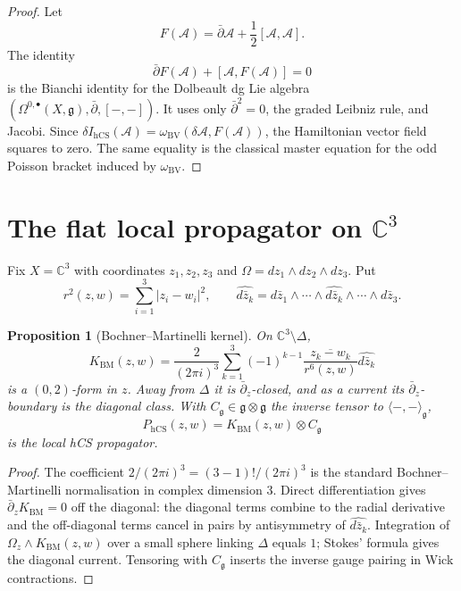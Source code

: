 \documentclass[11pt]{amsart}
\providecommand{\C}{\mathbb{C}}
\providecommand{\dbar}{\bar{\partial}}
\providecommand{\g}{\mathfrak{g}}
\providecommand{\hCS}{\mathrm{hCS}}
\providecommand{\BV}{\mathrm{BV}}
\theoremstyle{plain}
\newtheorem{proposition}[theorem]{Proposition}
\theoremstyle{definition}
\theoremstyle{remark}
\begin{document}
\begin{proof}
Let
\[
  F(\mathcal A)=\dbar\mathcal A+\frac{1}{2}[\mathcal A,\mathcal A].
\]
The identity
\[
  \dbar F(\mathcal A)+[\mathcal A,F(\mathcal A)]=0
\]
is the Bianchi identity for the Dolbeault dg Lie algebra
\((\Omega^{0,\bullet}(X,\g),\dbar,[-,-])\). It uses only
\(\dbar^2=0\), the graded Leibniz rule, and Jacobi. Since
\(\delta I_{\hCS}(\mathcal A)=\omega_{\BV}(\delta\mathcal A,F(\mathcal A))\),
the Hamiltonian vector field squares to zero. The same equality is the
classical master equation for the odd Poisson bracket induced by
\(\omega_{\BV}\).
\end{proof}

\section{The flat local propagator on \texorpdfstring{$\C^3$}{C3}}

Fix \(X=\C^3\) with coordinates \(z_1,z_2,z_3\) and
\(\Omega=dz_1\wedge dz_2\wedge dz_3\). Put
\[
  r^2(z,w)=\sum_{i=1}^{3}|z_i-w_i|^2,
  \qquad
  \widehat{d\bar z_k}
  =
  d\bar z_1\wedge\cdots\wedge\widehat{d\bar z_k}
  \wedge\cdots\wedge d\bar z_3 .
\]

\begin{proposition}[Bochner--Martinelli kernel]
On \(\C^3\setminus\Delta\),
\[
  K_{\mathrm{BM}}(z,w)
  =
  \frac{2}{(2\pi i)^3}
  \sum_{k=1}^{3}
  (-1)^{k-1}
  \frac{\overline{z_k-w_k}}{r^6(z,w)}
  \widehat{d\bar z_k}
\]
is a \((0,2)\)-form in \(z\). Away from \(\Delta\) it is
\(\dbar_z\)-closed, and as a current its \(\dbar_z\)-boundary is the
diagonal class. With \(C_\g\in\g\otimes\g\) the inverse tensor to
\(\langle-,-\rangle_\g\),
\[
  P_{\hCS}(z,w)=K_{\mathrm{BM}}(z,w)\otimes C_\g
\]
is the local hCS propagator.
\end{proposition}

\begin{proof}
The coefficient \(2/(2\pi i)^3=(3-1)!/(2\pi i)^3\) is the standard
Bochner--Martinelli normalisation in complex dimension \(3\). Direct
differentiation gives \(\dbar_z K_{\mathrm{BM}}=0\) off the diagonal:
the diagonal terms combine to the radial derivative and the
off-diagonal terms cancel in pairs by antisymmetry of
\(\widehat{d\bar z_k}\). Integration of
\(\Omega_z\wedge K_{\mathrm{BM}}(z,w)\) over a small sphere linking
\(\Delta\) equals \(1\); Stokes' formula gives the diagonal current.
Tensoring with \(C_\g\) inserts the inverse gauge pairing in Wick
contractions.
\end{proof}
\end{document}
